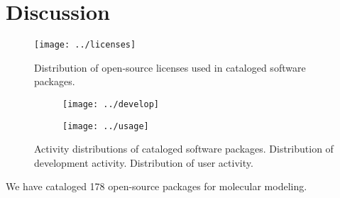 \section{Discussion}

\begin{figure}
\centering 
\texttt{[image: ../licenses]}
\caption{\label{licenses} Distribution of open-source licenses used in cataloged software packages.}
\end{figure}

\begin{figure*}
\centering
\begin{subfigure}[t]{.4\linewidth}
\centering \label{develop}
\texttt{[image: ../develop]}
\end{subfigure}
\hfill
\begin{subfigure}[t]{.4\linewidth}
\centering \label{usage}
\texttt{[image: ../usage]}
\end{subfigure}
\caption{\label{pies} Activity distributions of cataloged software packages.
 Distribution of development activity.  Distribution of user activity.
}
\end{figure*}

We have cataloged 178 open-source packages for molecular modeling.